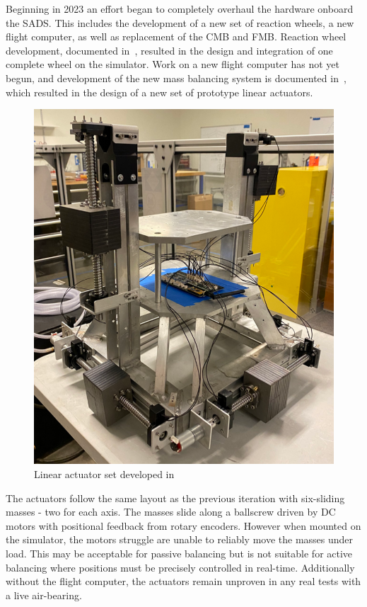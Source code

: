 Beginning in 2023 an effort began to completely overhaul the hardware onboard the SADS. This includes the development of a new set of reaction wheels, a new flight computer, as well as replacement of the CMB and FMB. Reaction wheel development, documented in~\cite{nalley2025development}, resulted in the design and integration of one complete wheel on the simulator. Work on a new flight computer has not yet begun, and development of the new mass balancing system is documented in~\cite{gilman_automatic_2024}, which resulted in the design of a new set of prototype linear actuators. 
\begin{figure}[h]\label{fig:gillman_final_work}
    \centering
    \includegraphics[width=0.70\linewidth]{figures/gillman_final_work.png}
    \caption{Linear actuator set developed in~\cite{gilman_automatic_2024}}
\end{figure}
The actuators follow the same layout as the previous iteration with six-sliding masses - two for each axis. The masses slide along a ballscrew driven by DC motors with positional feedback from rotary encoders. However when mounted on the simulator, the motors struggle are unable to reliably move the masses under load. This may be acceptable for passive balancing but is not suitable for active balancing where positions must be precisely controlled in real-time. Additionally without the flight computer, the actuators remain unproven in any real tests with a live air-bearing. 

